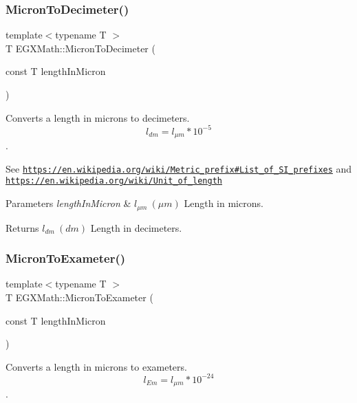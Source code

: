 \subsubsection{\texorpdfstring{Micron\+To\+Decimeter()}{MicronToDecimeter()}}
{\footnotesize\ttfamily template$<$typename T $>$ \\
T E\+G\+X\+Math\+::\+Micron\+To\+Decimeter (\begin{DoxyParamCaption}\item[{const T}]{length\+In\+Micron }\end{DoxyParamCaption})}



Converts a length in microns to decimeters. \[ l_{dm}=l_{\mu m} * 10^{-5} \]. 

See \href{https://en.wikipedia.org/wiki/Metric_prefix#List_of_SI_prefixes}{\tt https\+://en.\+wikipedia.\+org/wiki/\+Metric\+\_\+prefix\#\+List\+\_\+of\+\_\+\+S\+I\+\_\+prefixes} and \href{https://en.wikipedia.org/wiki/Unit_of_length}{\tt https\+://en.\+wikipedia.\+org/wiki/\+Unit\+\_\+of\+\_\+length} 
\begin{DoxyParams}{Parameters}
{\em length\+In\+Micron} & $ l_{\mu m}\ (\mu m)$ Length in microns. \\
\hline
\end{DoxyParams}
\begin{DoxyReturn}{Returns}
$ l_{dm}\ (dm)$ Length in decimeters. 
\end{DoxyReturn}
\mbox{\label{group___e_g_x_math-_conversions-_length_conversions-_non-_s_i-_micron-_s_i_ga818e4c9f7eeb588ba87d5c16dba25fdd}} 
\subsubsection{\texorpdfstring{Micron\+To\+Exameter()}{MicronToExameter()}}
{\footnotesize\ttfamily template$<$typename T $>$ \\
T E\+G\+X\+Math\+::\+Micron\+To\+Exameter (\begin{DoxyParamCaption}\item[{const T}]{length\+In\+Micron }\end{DoxyParamCaption})}



Converts a length in microns to exameters. \[ l_{Em}=l_{\mu m} * 10^{-24} \]. 

